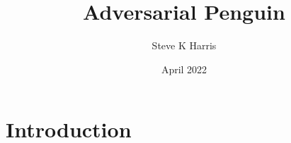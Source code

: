 \documentclass{article}
\title{Adversarial Penguin}
\author{Steve K Harris}
\date{April 2022}
\begin{document}
\maketitle

\section{Introduction}
\end{document}
